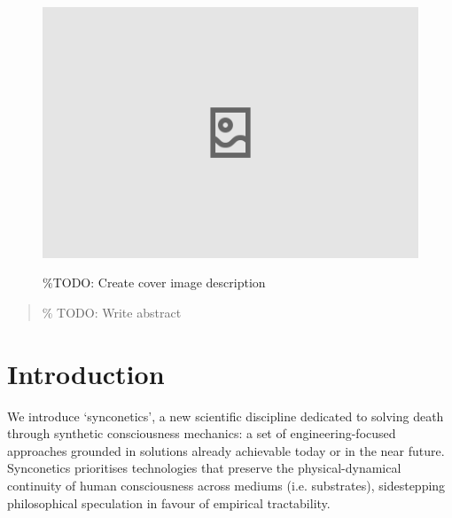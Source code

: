 \documentclass[10pt]{article}
\begin{document}
\begin{sloppypar}

  \begin{figure}[ht]
    \centering
    \includegraphics[width=\textwidth]{figures/cover.png}
    \label{fig:cover}
    \caption{\%TODO: Create cover image description}
  \end{figure}
  \newpage


  \begin{abstract}
    \% TODO: Write abstract
  \end{abstract}

  \pagebreak
  \tableofcontents
  \pagebreak
  \listoffigures
  \pagebreak


  \section{Introduction}
  \label{sec:introduction}

  We introduce ‘synconetics’, a new scientific discipline dedicated to solving death through synthetic consciousness mechanics: a set of engineering-focused approaches grounded in solutions already achievable today or in the near future. Synconetics prioritises technologies that preserve the physical-dynamical continuity of human consciousness across mediums (i.e. substrates), sidestepping philosophical speculation in favour of empirical tractability.


\end{sloppypar}
\end{document}
